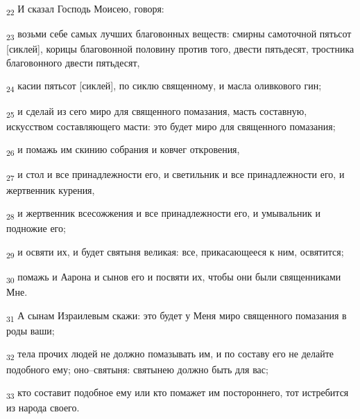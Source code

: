 \begin{tcolorbox}
\textsubscript{22} И сказал Господь Моисею, говоря:
\end{tcolorbox}
\begin{tcolorbox}
\textsubscript{23} возьми себе самых лучших благовонных веществ: смирны самоточной пятьсот [сиклей], корицы благовонной половину против того, двести пятьдесят, тростника благовонного двести пятьдесят,
\end{tcolorbox}
\begin{tcolorbox}
\textsubscript{24} касии пятьсот [сиклей], по сиклю священному, и масла оливкового гин;
\end{tcolorbox}
\begin{tcolorbox}
\textsubscript{25} и сделай из сего миро для священного помазания, масть составную, искусством составляющего масти: это будет миро для священного помазания;
\end{tcolorbox}
\begin{tcolorbox}
\textsubscript{26} и помажь им скинию собрания и ковчег откровения,
\end{tcolorbox}
\begin{tcolorbox}
\textsubscript{27} и стол и все принадлежности его, и светильник и все принадлежности его, и жертвенник курения,
\end{tcolorbox}
\begin{tcolorbox}
\textsubscript{28} и жертвенник всесожжения и все принадлежности его, и умывальник и подножие его;
\end{tcolorbox}
\begin{tcolorbox}
\textsubscript{29} и освяти их, и будет святыня великая: все, прикасающееся к ним, освятится;
\end{tcolorbox}
\begin{tcolorbox}
\textsubscript{30} помажь и Аарона и сынов его и посвяти их, чтобы они были священниками Мне.
\end{tcolorbox}
\begin{tcolorbox}
\textsubscript{31} А сынам Израилевым скажи: это будет у Меня миро священного помазания в роды ваши;
\end{tcolorbox}
\begin{tcolorbox}
\textsubscript{32} тела прочих людей не должно помазывать им, и по составу его не делайте подобного ему; оно--святыня: святынею должно быть для вас;
\end{tcolorbox}
\begin{tcolorbox}
\textsubscript{33} кто составит подобное ему или кто помажет им постороннего, тот истребится из народа своего.
\end{tcolorbox}
